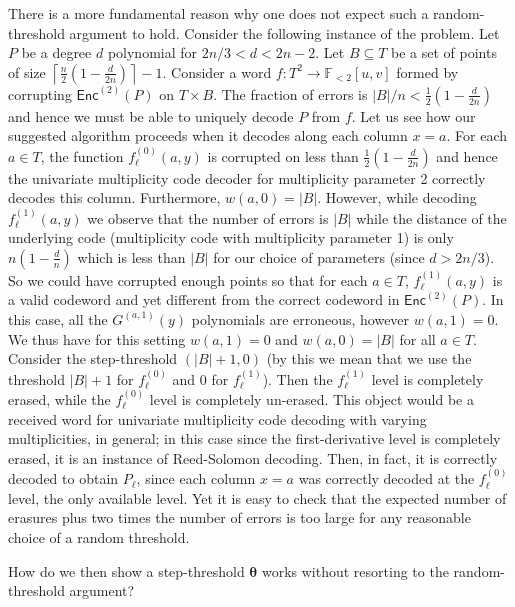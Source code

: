 \documentclass{theoretics}
\def\Field{\mathbb{F}}
\let\F\Field
\newcommand{\enc}{{\mathsf{Enc}}}
\newcommand{\thetabar}{{\boldsymbol{\theta}}}
\begin{document}
	There is a more fundamental reason why one does not expect such a
	random-threshold argument to hold. Consider the following instance of
	the problem. Let $P$ be a degree $d$ polynomial for $2n/3< d <
	2n-2$. Let $B \subseteq T$ be a set of points of size
	$\left\lceil \frac{n}{2}\left(1-\frac{d}{2n}\right)\right\rceil
	-1$. Consider a word $f\colon T^2 \to \F_{<2}[u,v]$ formed by
	corrupting $\enc^{(2)}(P)$ on $T \times B$. The fraction of errors is
	$|B|/n < \frac12\left(1-\frac{d}{2n}\right)$ and hence we must be able
	to uniquely decode $P$ from $f$. Let us see how our suggested
	algorithm proceeds when it decodes along each column $x=a$. For each
	$a \in T$, the function $f_\ell^{(0)}(a,y)$ is corrupted on less than
	$\frac12\left(1-\frac{d}{2n}\right)$ and hence the univariate
	multiplicity code decoder for multiplicity parameter 2 correctly
	decodes this column. Furthermore, $w(a,0) = |B|$. However, while
	decoding $f_\ell^{(1)}(a,y)$ we observe that the number of errors is
	$|B|$ while the distance of the underlying code (multiplicity code
	with multiplicity parameter 1) is only $n\left(1- \frac{d}{n}\right)$
	which is less than $|B|$ for our choice of parameters (since $d > 2n/3$). So we could have
	corrupted enough points so that for each $a\in T$, $f^{(1)}_\ell(a,y)$
	is a valid codeword and yet different from the correct codeword in
	$\enc^{(2)}(P)$. In this case, all the $G^{(a,1)}(y)$ polynomials are
	erroneous, however $w(a,1) = 0$. We thus have for this setting
	$w(a,1) = 0$ and $w(a,0) = |B|$ for all $a \in T$. Consider the
	step-threshold $(|B|+1, 0)$ (by this we mean that we use the threshold
	$|B| + 1$ for $f_{\ell}^{(0)}$ and $0$ for $f_{\ell}^{(1)}$). Then the $f_\ell^{(1)}$ level is completely erased, while the $f_\ell^{(0)}$ level is completely un-erased. This object would be a received word for univariate multiplicity code decoding with varying multiplicities, in general; in this case since the first-derivative level is completely erased, it is an instance of Reed-Solomon decoding. Then, in fact, it is correctly decoded to obtain $P_\ell$, since each column $x=a$ was correctly decoded at the $f_\ell^{(0)}$ level, the only available level. Yet it is easy to check that the expected number of
	erasures plus two times the number of errors is too large for any
	reasonable choice of a random threshold. 
	
	How do we then show a step-threshold $\thetabar$ works without  
	resorting to the random-threshold argument?
	
\end{document}
